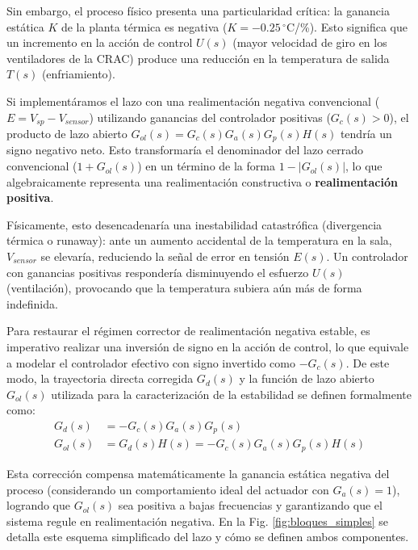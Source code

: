 \documentclass[journal,twocolumn]{IEEEtran}
\begin{document}
Sin embargo, el proceso físico presenta una particularidad crítica: la ganancia estática $K$ de la planta térmica es negativa ($K = -0.25\,^\circ$C/\%). Esto significa que un incremento en la acción de control $U(s)$ (mayor velocidad de giro en los ventiladores de la CRAC) produce una reducción en la temperatura de salida $T(s)$ (enfriamiento).

Si implementáramos el lazo con una realimentación negativa convencional ($E = V_{sp} - V_{sensor}$) utilizando ganancias del controlador positivas ($G_c(s) > 0$), el producto de lazo abierto $G_{ol}(s) = G_c(s) G_a(s) G_p(s) H(s)$ tendría un signo negativo neto. Esto transformaría el denominador del lazo cerrado convencional ($1 + G_{ol}(s)$) en un término de la forma $1 - |G_{ol}(s)|$, lo que algebraicamente representa una realimentación constructiva o \textbf{realimentación positiva}.

Físicamente, esto desencadenaría una inestabilidad catastrófica (divergencia térmica o runaway): ante un aumento accidental de la temperatura en la sala, $V_{sensor}$ se elevaría, reduciendo la señal de error en tensión $E(s)$. Un controlador con ganancias positivas respondería disminuyendo el esfuerzo $U(s)$ (ventilación), provocando que la temperatura subiera aún más de forma indefinida.

Para restaurar el régimen corrector de realimentación negativa estable, es imperativo realizar una inversión de signo en la acción de control, lo que equivale a modelar el controlador efectivo con signo invertido como $-G_c(s)$. De este modo, la trayectoria directa corregida $G_d(s)$ y la función de lazo abierto $G_{ol}(s)$ utilizada para la caracterización de la estabilidad se definen formalmente como:
\begin{align}
    G_d(s) &= - G_c(s) G_a(s) G_p(s) \\
    G_{ol}(s) &= G_d(s) H(s) = - G_c(s) G_a(s) G_p(s) H(s)
\end{align}

Esta corrección compensa matemáticamente la ganancia estática negativa del proceso (considerando un comportamiento ideal del actuador con $G_a(s) = 1$), logrando que $G_{ol}(s)$ sea positiva a bajas frecuencias y garantizando que el sistema regule en realimentación negativa. En la Fig. \ref{fig:bloques_simples} se detalla este esquema simplificado del lazo y cómo se definen ambos componentes.
\end{document}
